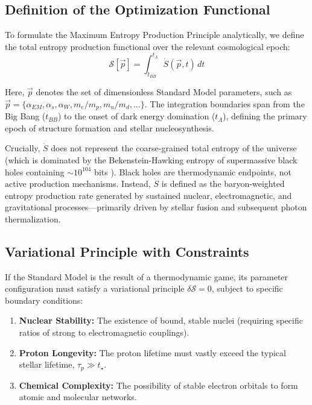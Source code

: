 \documentclass[12pt,a4paper]{article}
\theoremstyle{remark}
\begin{document}
\subsection{Definition of the Optimization Functional}

To formulate the Maximum Entropy Production Principle analytically, we define the total entropy production functional over the relevant cosmological epoch:
\begin{equation}
\mathcal{S}[\vec{p}] = \int_{t_{BB}}^{t_\Lambda} \dot{S}(\vec{p}, t) \, dt
\end{equation}

Here, $\vec{p}$ denotes the set of dimensionless Standard Model parameters, such as $\vec{p} = \{\alpha_{EM}, \alpha_s, \alpha_W, m_e/m_p, m_u/m_d, \ldots\}$. The integration boundaries span from the Big Bang ($t_{BB}$) to the onset of dark energy domination ($t_\Lambda$), defining the primary epoch of structure formation and stellar nucleosynthesis.

Crucially, $\dot{S}$ does not represent the coarse-grained total entropy of the universe (which is dominated by the Bekenstein-Hawking entropy of supermassive black holes containing $\sim 10^{104}$ bits \citep{EntropyMaximum}). Black holes are thermodynamic endpoints, not active production mechanisms. Instead, $\dot{S}$ is defined as the baryon-weighted entropy production rate generated by sustained nuclear, electromagnetic, and gravitational processes---primarily driven by stellar fusion and subsequent photon thermalization.

\subsection{Variational Principle with Constraints}

If the Standard Model is the result of a thermodynamic game, its parameter configuration must satisfy a variational principle $\delta \mathcal{S} = 0$, subject to specific boundary conditions:
\begin{enumerate}
    \item \textbf{Nuclear Stability:} The existence of bound, stable nuclei (requiring specific ratios of strong to electromagnetic couplings).
    \item \textbf{Proton Longevity:} The proton lifetime must vastly exceed the typical stellar lifetime, $\tau_p \gg t_\star$.
    \item \textbf{Chemical Complexity:} The possibility of stable electron orbitals to form atomic and molecular networks.
\end{enumerate}
\end{document}
